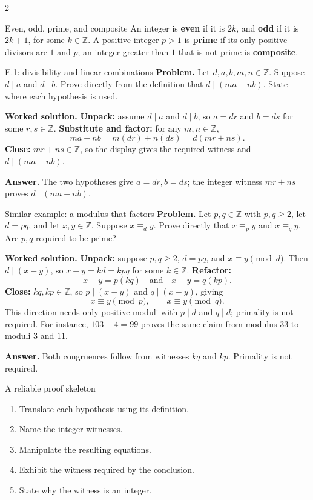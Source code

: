 \documentclass[10pt]{article}
\newcommand{\Z}{\mathbb Z}
\newcommand{\term}[1]{\textbf{\color{DivNavy}#1}}
\newcommand{\equivmod}[1]{\mathrel{\equiv_{#1}}}
\begin{document}
\begingroup
{}
\begin{multicols}{2}\small
\begin{definitionbox}{Even, odd, prime, and composite}
An integer is \term{even} if it is $2k$, and \term{odd} if it is $2k+1$,
for some $k\in\Z$. A positive integer $p>1$ is \term{prime} if its only
positive divisors are $1$ and $p$; an integer greater than $1$ that is not
prime is \term{composite}.
\end{definitionbox}

\begin{workedbox}{E.1: divisibility and linear combinations}
\textbf{Problem.} Let $d,a,b,m,n\in\Z$. Suppose $d\mid a$ and $d\mid b$. Prove directly from the definition that $d\mid(ma+nb)$. State where each hypothesis is used.

\textbf{Worked solution.} \textbf{Unpack:} assume $d\mid a$ and $d\mid b$, so $a=dr$ and $b=ds$ for
some $r,s\in\Z$. \textbf{Substitute and factor:} for any $m,n\in\Z$,
\[
ma+nb=m(dr)+n(ds)=d(mr+ns).
\]
\textbf{Close:} $mr+ns\in\Z$, so the display gives the required witness and
$d\mid(ma+nb)$.

\textbf{Answer.} The two hypotheses give $a=dr,b=ds$; the integer witness $mr+ns$ proves $d\mid(ma+nb)$.
\end{workedbox}

\begin{workedbox}{Similar example: a modulus that factors}
\textbf{Problem.} Let $p,q\in\Z$ with $p,q\ge2$, let $d=pq$, and let $x,y\in\Z$. Suppose $x\equivmod d y$. Prove directly that $x\equivmod p y$ and $x\equivmod q y$. Are $p,q$ required to be prime?

\textbf{Worked solution.} \textbf{Unpack:} suppose $p,q\ge2$, $d=pq$, and $x\equiv y\pmod d$. Then
$d\mid(x-y)$, so $x-y=kd=kpq$ for some $k\in\Z$. \textbf{Refactor:}
\[
x-y=p(kq)\quad\text{and}\quad x-y=q(kp).
\]
\textbf{Close:} $kq,kp\in\Z$, so $p\mid(x-y)$ and $q\mid(x-y)$, giving
\[
x\equiv y\pmod p,\qquad x\equiv y\pmod q.
\]
This direction needs only positive moduli with $p\mid d$ and $q\mid d$;
primality is not required. For instance, $103-4=99$ proves the same claim
from modulus $33$ to moduli $3$ and $11$.

\textbf{Answer.} Both congruences follow from witnesses $kq$ and $kp$. Primality is not required.
\end{workedbox}


\begin{methodbox}{A reliable proof skeleton}
\begin{enumerate}
  \item Translate each hypothesis using its definition.
  \item Name the integer witnesses.
  \item Manipulate the resulting equations.
  \item Exhibit the witness required by the conclusion.
  \item State why the witness is an integer.
\end{enumerate}
\end{methodbox}


\end{multicols}
\end{document}
